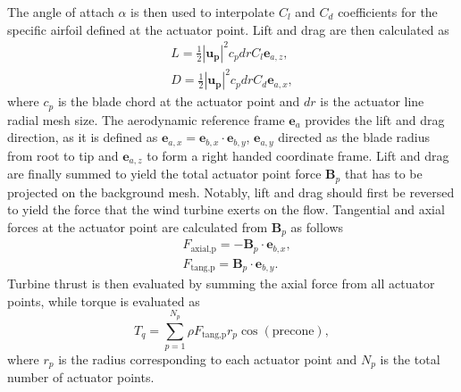 The angle of attach $\alpha$ is then used to interpolate $C_l$ and $C_d$ coefficients for the specific airfoil defined at the actuator point. Lift and drag are then calculated as
\begin{align}
	L = \frac{1}{2}|\mathbf{u_p}|^2 c_p dr C_l\mathbf{e}_{a,z}, \label{eq:bladeLift} \\
	D = \frac{1}{2}|\mathbf{u_p}|^2 c_p dr C_d\mathbf{e}_{a,x}, \label{eq:bladeDrag}
\end{align}
where $c_p$ is the blade chord at the actuator point and $dr$ is the actuator line radial mesh size. The aerodynamic reference frame $\mathbf{e}_{a}$ provides the lift and drag direction, as it is defined as $\mathbf{e}_{a,x} = \mathbf{e}_{b,x} \cdot \mathbf{e}_{b,y}$, $\mathbf{e}_{a,y}$ directed as the blade radius from root to tip and $\mathbf{e}_{a,z}$ to form a right handed coordinate frame. Lift and drag are finally summed to yield the total actuator point force $\mathbf{B}_p$ that has to be projected on the background mesh. Notably, lift and drag should first be reversed to yield the force that the wind turbine exerts on the flow. Tangential and axial forces at the actuator point are calculated from $\mathbf{B}_p$ as follows
\begin{align}
	&F_\text{axial,p} = - \mathbf{B}_p \cdot \mathbf{e}_{b,x}, \label{eq:axialForce} \\
	&F_\text{tang,p} =   \mathbf{B}_p \cdot \mathbf{e}_{b,y}. \label{eq:tangForce}
\end{align}
Turbine thrust is then evaluated by summing the axial force from all actuator points, while torque is evaluated as
\begin{equation}
	T_q = \sum_{p=1}^{N_p}\rho F_\text{tang,p}  r_p \cos(\text{precone}), \label{eq:torqueALM} 
\end{equation}
where $r_p$ is the radius corresponding to each actuator point and $N_p$ is the total number of actuator points.

